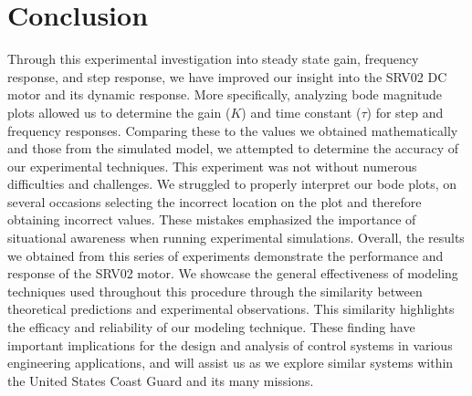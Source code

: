 \documentclass[conference,compsoc]{IEEEtran}
\begin{document}
  \section{Conclusion}
  Through this experimental investigation into steady state gain, frequency response, and step response, we have improved our insight into the SRV02 DC motor and its dynamic response. More specifically, analyzing bode magnitude plots allowed us to determine the gain ($K$) and time constant ($\tau$) for step and frequency responses. Comparing these to the values we obtained mathematically and those from the simulated model, we attempted to determine the accuracy of our experimental techniques.
  This experiment was not without numerous difficulties and challenges. We struggled to properly interpret our bode plots, on several occasions selecting the incorrect location on the plot and therefore obtaining incorrect values. These mistakes emphasized the importance of situational awareness when running experimental simulations.
  Overall, the results we obtained from this series of experiments demonstrate the performance and response of the SRV02 motor. We showcase the general effectiveness of modeling techniques used throughout this procedure through the similarity between theoretical predictions and experimental observations. This similarity highlights the efficacy and reliability of our modeling technique. These finding have important implications for the design and analysis of control systems in various engineering applications, and will assist us as we explore similar systems within the United States Coast Guard and its many missions. 

\end{document}
